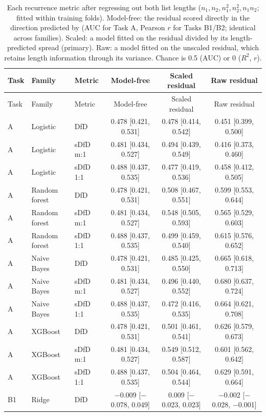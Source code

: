 \begin{longtable}{lllccc}
\caption{Each recurrence metric after regressing out both list lengths ($n_1, n_2, n_1^2, n_2^2, n_1 n_2$; fitted within training folds). Model-free: the residual scored directly in the direction predicted by \citet{maboudian2022} (AUC for Task A, Pearson $r$ for Tasks B1/B2; identical across families). Scaled: a model fitted on the residual divided by its length-predicted spread (primary). Raw: a model fitted on the unscaled residual, which retains length information through its variance. Chance is 0.5 (AUC) or 0 ($R^2$, $r$).}\label{tab:supp_residual}\\
\toprule
Task & Family & Metric & Model-free & Scaled residual & Raw residual \\
\midrule
\endfirsthead
\toprule
Task & Family & Metric & Model-free & Scaled residual & Raw residual \\
\midrule
\endhead
A & Logistic & DfD & 0.478 [0.421, 0.531] & 0.478 [0.414, 0.542] & 0.451 [0.399, 0.500] \\
A & Logistic & sDfD m:1 & 0.481 [0.434, 0.527] & 0.494 [0.439, 0.549] & 0.416 [0.373, 0.460] \\
A & Logistic & sDfD 1:1 & 0.488 [0.437, 0.535] & 0.477 [0.419, 0.536] & 0.458 [0.412, 0.505] \\
A & Random forest & DfD & 0.478 [0.421, 0.531] & 0.508 [0.467, 0.551] & 0.599 [0.553, 0.644] \\
A & Random forest & sDfD m:1 & 0.481 [0.434, 0.527] & 0.548 [0.505, 0.593] & 0.565 [0.529, 0.603] \\
A & Random forest & sDfD 1:1 & 0.488 [0.437, 0.535] & 0.499 [0.459, 0.540] & 0.615 [0.576, 0.652] \\
A & Naive Bayes & DfD & 0.478 [0.421, 0.531] & 0.485 [0.425, 0.550] & 0.665 [0.618, 0.713] \\
A & Naive Bayes & sDfD m:1 & 0.481 [0.434, 0.527] & 0.496 [0.440, 0.552] & 0.680 [0.637, 0.724] \\
A & Naive Bayes & sDfD 1:1 & 0.488 [0.437, 0.535] & 0.472 [0.416, 0.535] & 0.664 [0.621, 0.708] \\
A & XGBoost & DfD & 0.478 [0.421, 0.531] & 0.501 [0.461, 0.541] & 0.626 [0.579, 0.673] \\
A & XGBoost & sDfD m:1 & 0.481 [0.434, 0.527] & 0.549 [0.512, 0.587] & 0.601 [0.562, 0.642] \\
A & XGBoost & sDfD 1:1 & 0.488 [0.437, 0.535] & 0.504 [0.464, 0.544] & 0.629 [0.591, 0.664] \\
B1 & Ridge & DfD & $-$0.009 [$-$0.078, 0.049] & 0.009 [$-$0.023, 0.023] & $-$0.002 [$-$0.028, $-$0.001] \\

\end{longtable}
